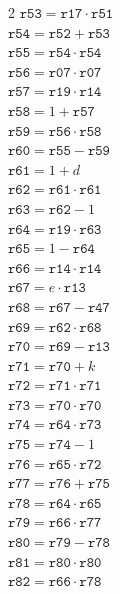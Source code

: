 \documentclass[10pt]{article}
\begin{document}
\begin{multicols}{2}
\(\mathtt{r53} = \mathtt{r17} \cdot \mathtt{r51}\)\\
\(\mathtt{r54} = \mathtt{r52} + \mathtt{r53}\)\\
\(\mathtt{r55} = \mathtt{r54} \cdot \mathtt{r54}\)\\
\(\mathtt{r56} = \mathtt{r07} \cdot \mathtt{r07}\)\\
\(\mathtt{r57} = \mathtt{r19} \cdot \mathtt{r14}\)\\
\(\mathtt{r58} = 1 + \mathtt{r57}\)\\
\(\mathtt{r59} = \mathtt{r56} \cdot \mathtt{r58}\)\\
\(\mathtt{r60} = \mathtt{r55} - \mathtt{r59}\)\\
\(\mathtt{r61} = 1 + d\)\\
\(\mathtt{r62} = \mathtt{r61} \cdot \mathtt{r61}\)\\
\(\mathtt{r63} = \mathtt{r62} - 1\)\\
\(\mathtt{r64} = \mathtt{r19} \cdot \mathtt{r63}\)\\
\(\mathtt{r65} = 1 - \mathtt{r64}\)\\
\(\mathtt{r66} = \mathtt{r14} \cdot \mathtt{r14}\)\\
\(\mathtt{r67} = e \cdot \mathtt{r13}\)\\
\(\mathtt{r68} = \mathtt{r67} - \mathtt{r47}\)\\
\(\mathtt{r69} = \mathtt{r62} \cdot \mathtt{r68}\)\\
\(\mathtt{r70} = \mathtt{r69} - \mathtt{r13}\)\\
\(\mathtt{r71} = \mathtt{r70} + k\)\\
\(\mathtt{r72} = \mathtt{r71} \cdot \mathtt{r71}\)\\
\(\mathtt{r73} = \mathtt{r70} \cdot \mathtt{r70}\)\\
\(\mathtt{r74} = \mathtt{r64} \cdot \mathtt{r73}\)\\
\(\mathtt{r75} = \mathtt{r74} - 1\)\\
\(\mathtt{r76} = \mathtt{r65} \cdot \mathtt{r72}\)\\
\(\mathtt{r77} = \mathtt{r76} + \mathtt{r75}\)\\
\(\mathtt{r78} = \mathtt{r64} \cdot \mathtt{r65}\)\\
\(\mathtt{r79} = \mathtt{r66} \cdot \mathtt{r77}\)\\
\(\mathtt{r80} = \mathtt{r79} - \mathtt{r78}\)\\
\(\mathtt{r81} = \mathtt{r80} \cdot \mathtt{r80}\)\\
\(\mathtt{r82} = \mathtt{r66} \cdot \mathtt{r78}\)\\

\end{multicols}
\end{document}
